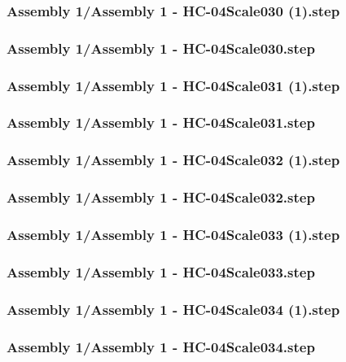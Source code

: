 \documentclass[a4paper,12pt]{article}
\begin{document}
\begin{lstlising}[language=C++]
\subsubsection{Assembly 1/Assembly 1 - HC-04Scale030 (1).step}

\subsubsection{Assembly 1/Assembly 1 - HC-04Scale030.step}

\subsubsection{Assembly 1/Assembly 1 - HC-04Scale031 (1).step}

\subsubsection{Assembly 1/Assembly 1 - HC-04Scale031.step}

\subsubsection{Assembly 1/Assembly 1 - HC-04Scale032 (1).step}

\subsubsection{Assembly 1/Assembly 1 - HC-04Scale032.step}

\subsubsection{Assembly 1/Assembly 1 - HC-04Scale033 (1).step}

\subsubsection{Assembly 1/Assembly 1 - HC-04Scale033.step}

\subsubsection{Assembly 1/Assembly 1 - HC-04Scale034 (1).step}

\subsubsection{Assembly 1/Assembly 1 - HC-04Scale034.step}


\end{lstlising}
\end{document}

